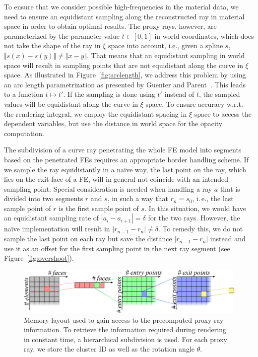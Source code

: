 \documentclass[journal]{vgtc}                %
\begin{document}
To ensure that we consider possible high-frequencies in the material data, we need to ensure an equidistant sampling along the reconstructed ray in material space in order to obtain optimal results. The proxy rays, however, are parameterized by the parameter value $t \in [0,1]$ in world coordinates, which does not take the shape of the ray in $\xi$ space into account, i.e., given a spline $s$, $\Vert s(x) - s(y) \Vert \neq \Vert x - y \Vert$. That means that an equidistant sampling in world space will result in sampling points that are not equidistant along the curve in $\xi$ space. As illustrated in Figure~\ref{fig:arclength}, we address this problem by using an arc length parametrization as presented by Guenter and Parent~\cite{guenter90arclength}. This leads to a function $t \mapsto t'$. If the sampling is done using $t'$ instead of $t$, the sampled values will be equidistant along the curve in $\xi$ space. To ensure accuracy w.r.t. the rendering integral, we employ the equidistant spacing in $\xi$ space to access the dependent variables, but use the distance in world space for the opacity computation.

The subdivision of a curve ray penetrating the whole FE model into segments based on the penetrated FEs requires an appropriate border handling scheme. If we sample the ray equidistantly in a na\"ive way, the last point on the ray, which lies on the exit face of a FE, will in general not coincide with an intended sampling point. Special consideration is needed when handling a ray $a$ that is divided into two segments $r$ and $s$, in such a way that $r_n = s_0$, i.\,e., the last sample point of $r$ is the first sample point of $s$. In this situation, we would have an equidistant sampling rate of $\left|a_i - a_{i+1}\right| = \delta$ for the two rays. However, the na\"ive implementation will result in $\left|r_{n-1} - r_{n}\right| \neq \delta$. To remedy this, we do not sample the last point on each ray but save the distance $\left|r_{n-1} - r_{n}\right|$ instead and use it as an offset for the first sampling point in the next ray segment (see Figure~\ref{fig:overshoot}).
%
%
%
\begin{figure}[t]
    \centering
    \includegraphics[width=0.75\linewidth]{figures/memory_layout.pdf}
    \caption{Memory layout used to gain access to the precomputed proxy ray information. To retrieve the information required during rendering in constant time, a hierarchical subdivision is used. For each proxy ray, we store the cluster ID as well as the rotation angle $\theta$.}
    \label{fig:memory_layout}
\end{figure}
%
%
%
\end{document}
